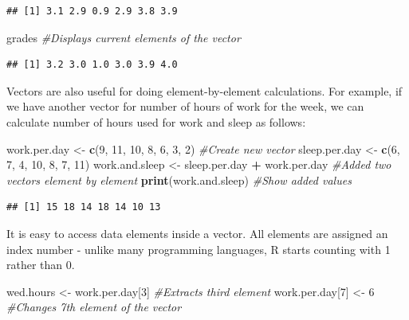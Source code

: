 \documentclass[]{krantz}
\makeatletter
\newenvironment{Shaded}{\begin{snugshade}}{\end{snugshade}}
\newcommand{\KeywordTok}[1]{\textcolor[rgb]{0.27,0.27,0.27}{\textbf{#1}}}
\newcommand{\DecValTok}[1]{\textcolor[rgb]{0.06,0.06,0.06}{#1}}
\newcommand{\StringTok}[1]{\textcolor[rgb]{0.5,0.5,0.5}{#1}}
\newcommand{\CommentTok}[1]{\textcolor[rgb]{0.56,0.35,0.01}{\textit{#1}}}
\newcommand{\OperatorTok}[1]{\textcolor[rgb]{0.81,0.36,0.00}{\textbf{#1}}}
\newcommand{\NormalTok}[1]{#1}
\newenvironment{kframe}{%
\medskip{}
\setlength{\fboxsep}{.8em}
 \def\at@end@of@kframe{}%
 \ifinner\ifhmode%
  \def\at@end@of@kframe{\end{minipage}}%
  \begin{minipage}{\columnwidth}%
 \fi\fi%
 \def\FrameCommand##1{\hskip\@totalleftmargin \hskip-\fboxsep
 \colorbox{shadecolor}{##1}\hskip-\fboxsep
     \hskip-\linewidth \hskip-\@totalleftmargin \hskip\columnwidth}%
 \MakeFramed {\advance\hsize-\width
   \@totalleftmargin\z@ \linewidth\hsize
   \@setminipage}}%
 {\par\unskip\endMakeFramed%
 \at@end@of@kframe}
\renewenvironment{Shaded}{\begin{kframe}}{\end{kframe}}
\theoremstyle{definition}
\theoremstyle{definition}
\theoremstyle{definition}
\theoremstyle{remark}
\makeatother
\begin{document}
\begin{verbatim}
## [1] 3.1 2.9 0.9 2.9 3.8 3.9
\end{verbatim}

\begin{Shaded}
\begin{Highlighting}[]
\NormalTok{grades }\CommentTok{#Displays current elements of the vector}
\end{Highlighting}
\end{Shaded}

\begin{verbatim}
## [1] 3.2 3.0 1.0 3.0 3.9 4.0
\end{verbatim}

Vectors are also useful for doing element-by-element calculations. For
example, if we have another vector for number of hours of work for the
week, we can calculate number of hours used for work and sleep as
follows:

\begin{Shaded}
\begin{Highlighting}[]
\NormalTok{work.per.day <-}\StringTok{ }\KeywordTok{c}\NormalTok{(}\DecValTok{9}\NormalTok{, }\DecValTok{11}\NormalTok{, }\DecValTok{10}\NormalTok{, }\DecValTok{8}\NormalTok{, }\DecValTok{6}\NormalTok{, }\DecValTok{3}\NormalTok{, }\DecValTok{2}\NormalTok{) }\CommentTok{#Create new vector}
\NormalTok{sleep.per.day <-}\StringTok{ }\KeywordTok{c}\NormalTok{(}\DecValTok{6}\NormalTok{, }\DecValTok{7}\NormalTok{, }\DecValTok{4}\NormalTok{, }\DecValTok{10}\NormalTok{, }\DecValTok{8}\NormalTok{, }\DecValTok{7}\NormalTok{, }\DecValTok{11}\NormalTok{)}
\NormalTok{work.and.sleep <-}\StringTok{ }\NormalTok{sleep.per.day }\OperatorTok{+}\StringTok{ }\NormalTok{work.per.day }
\CommentTok{#Added two vectors element by element}
\KeywordTok{print}\NormalTok{(work.and.sleep) }\CommentTok{#Show added values}
\end{Highlighting}
\end{Shaded}

\begin{verbatim}
## [1] 15 18 14 18 14 10 13
\end{verbatim}

It is easy to access data elements inside a vector. All elements are
assigned an index number - unlike many programming languages, R starts
counting with 1 rather than 0.

\begin{Shaded}
\begin{Highlighting}[]
\NormalTok{wed.hours <-}\StringTok{ }\NormalTok{work.per.day[}\DecValTok{3}\NormalTok{] }\CommentTok{#Extracts third element}
\NormalTok{work.per.day[}\DecValTok{7}\NormalTok{] <-}\StringTok{ }\DecValTok{6} \CommentTok{#Changes 7th element of the vector}
\end{Highlighting}
\end{Shaded}
\end{document}
